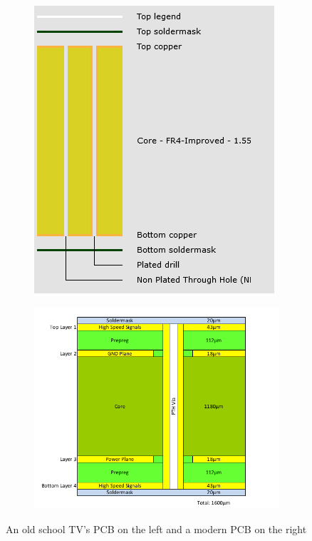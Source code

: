 \documentclass[final]{cubedoc}
\begin{document}
	\begin{figure}[h!]
		\centering
		\begin{subfigure}{.4\textwidth}
			\centering
			\includegraphics[height=0.25\textheight, width=\textwidth]{assets/2_layer_euro.png}
		\end{subfigure}
		\begin{subfigure}{.4\textwidth}
			\centering
			\includegraphics[height=0.25\textheight, width=\textwidth]{assets/4_layer_PCB.png}
		\end{subfigure}
		\caption{An old school TV's PCB on the left and a modern PCB on the right}
	\end{figure}
	
\end{document}
